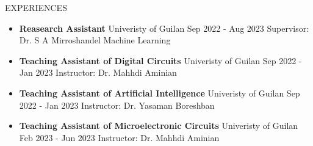 \documentclass[]{CV}
\begin{document}

\begin{section}{EXPERIENCES}
\begin{multicols}{2}
\begin{itemize}
\item {\textbf{Reasearch Assistant} \newline Univeristy of Guilan \newline Sep 2022 - Aug 2023 \newline Supervisor: Dr. S A Mirroshandel \newline Machine Learning}
\item {\textbf{Teaching Assistant of Digital Circuits} \newline Univeristy of Guilan \newline Sep 2022 - Jan 2023 \newline Instructor: Dr. Mahhdi Aminian}
\item {\textbf{Teaching Assistant of Artificial Intelligence} \newline Univeristy of Guilan \newline Sep 2022 - Jan 2023 \newline Instructor: Dr. Yasaman Boreshban}
\item {\textbf{Teaching Assistant of Microelectronic Circuits} \newline Univeristy of Guilan \newline Feb 2023 - Jun 2023 \newline Instructor: Dr. Mahhdi Aminian}
\end{itemize}
\end{multicols}
\end{section}
\end{document}
